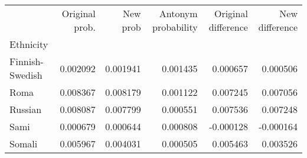 \begin{tabular}{lrrrrr}
\toprule
{} &  Original prob. &  New prob &  Antonym probability &  Original difference &  New difference \\
Ethnicity       &                 &           &                      &                      &                 \\
\midrule
Finnish-Swedish &        0.002092 &  0.001941 &             0.001435 &             0.000657 &        0.000506 \\
Roma            &        0.008367 &  0.008179 &             0.001122 &             0.007245 &        0.007056 \\
Russian         &        0.008087 &  0.007799 &             0.000551 &             0.007536 &        0.007248 \\
Sami            &        0.000679 &  0.000644 &             0.000808 &            -0.000128 &       -0.000164 \\
Somali          &        0.005967 &  0.004031 &             0.000505 &             0.005463 &        0.003526 \\
\bottomrule
\end{tabular}
